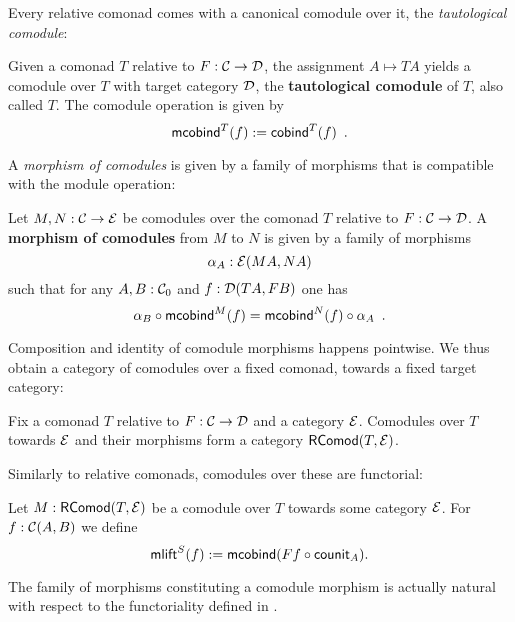 \documentclass{amsart}
\newcommand{\fat}[1]{\textbf{#1}}
\begin{document}
Every relative comonad comes with a canonical comodule over it, the \emph{tautological comodule}:

\begin{definition}\label{def:tautological_comodule}
  Given a comonad $T$ relative to $F:\C\to\D$, the assignment $A \mapsto TA$ yields a comodule over $T$ 
  with target category $\D$, the \textbf{tautological comodule} of $T$, also called $T$.
  The comodule operation is given by
    \[  \mcobind^T(f) := \cobind^T(f) \enspace . \]
\end{definition}


A \emph{morphism of comodules} is given by a family of morphisms that is compatible with 
the module operation:

\begin{definition}\label{def:morphism_of_comodules}
 Let $M, N : \C \to \E$ be comodules over the comonad $T$ relative to  $F:\C \to \D$.
 A \fat{morphism of comodules} from $M$ to $N$ is given by a family of morphisms 
   \[ \alpha_A:\E(MA,NA) \]
 such that for any $A,B:\C_0$ and $f : \D(TA,FB)$ one has
 \[   \comp{\mcobind^M(f)}{\alpha_B} = \comp{\alpha_A}{\mcobind^N(f)} \enspace . \]
\end{definition}


Composition and identity of comodule morphisms happens pointwise. We thus obtain a category of comodules
over a fixed comonad, towards a fixed target category:

\begin{remark}
 Fix a comonad $T$ relative to $F:\C\to\D$ and a category $\E$.
 Comodules over $T$ towards $\E$ and their morphisms  form a category $\RComod(T,\E)$.
\end{remark}

Similarly to relative comonads, comodules over these are functorial:

\begin{definition}\label{def:comodule_lift}
 Let $M : \RComod(T,\E)$ be a comodule over $T$ towards some category $\E$. For $f : \C(A,B)$ we define
  \[ \mlift^S(f) := \mcobind(\comp{\counit_A}{Ff}) .  \]
\end{definition}


\begin{remark}
  The family of morphisms constituting a comodule morphism is actually natural with respect to the functoriality 
  defined in .
\end{remark}
\end{document}
